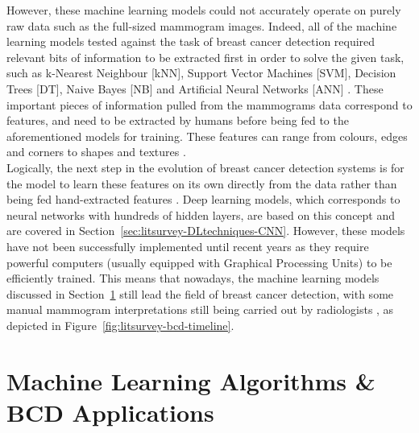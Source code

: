 However, these machine learning models could not accurately operate on purely raw data such as the full-sized mammogram images. Indeed, all of the machine learning models tested against the task of breast cancer detection required relevant bits of information to be extracted first in order to solve the given task, such as k-Nearest Neighbour [kNN], Support Vector Machines [SVM], Decision Trees [DT], Naive Bayes [NB] and Artificial Neural Networks [ANN] \cite{Yue2018} \cite{Asri2016}. These important pieces of information pulled from the mammograms data correspond to features, and need to be extracted by humans before being fed to the aforementioned models for training. These features can range from colours, edges and corners to shapes and textures \cite{Geron2019}.\\

Logically, the next step in the evolution of breast cancer detection systems is for the model to learn these features on its own directly from the data rather than being fed hand-extracted features \cite{Yala2019}. Deep learning models, which corresponds to neural networks with hundreds of hidden layers, are based on this concept and are covered in Section~\ref{sec:litsurvey-DLtechniques-CNN}. However, these models have not been successfully implemented until recent years as they require powerful computers (usually equipped with Graphical Processing Units) to be efficiently trained. This means that nowadays, the machine learning models discussed in Section~\ref{sec:litreview-MLmodel-BCDapplications} still lead the field of breast cancer detection, with some manual mammogram interpretations still being carried out by radiologists \cite{Litjens2017}, as depicted in Figure~\ref{fig:litsurvey-bcd-timeline}.



\section{Machine Learning Algorithms \& BCD Applications}
\label{sec:litreview-MLmodel-BCDapplications}

